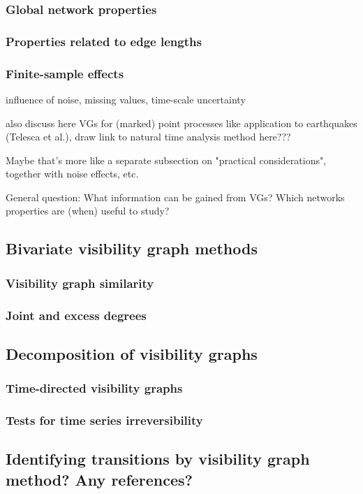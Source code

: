 		\subsubsection{Global network properties}
		\subsubsection{Properties related to edge lengths}
		\subsubsection{Finite-sample effects}

influence of noise, missing values, time-scale uncertainty

also discuss here VGs for (marked) point processes like application to
earthquakes (Telesca et al.), draw link to natural time analysis method here???   

Maybe that's more like a separate subsection on "practical considerations",
together with noise effects, etc.

General question: What information can be gained from VGs? Which networks
properties are (when) useful to study? 

	\subsection{Bivariate visibility graph methods}
		\subsubsection{Visibility graph similarity}
		\subsubsection{Joint and excess degrees}


	\subsection{Decomposition of visibility graphs}
		\subsubsection{Time-directed visibility graphs}
		\subsubsection{Tests for time series irreversibility}
	\subsection{{\color{red} Identifying transitions by visibility graph method?
	Any references?}}

